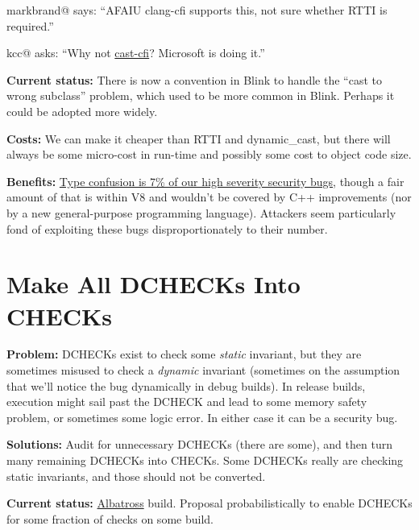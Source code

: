 \documentclass[a4paper,12pt,notitlepage,twoside,openright]{article}
\newcommand{\uline}[1]{#1}
\begin{document}
{markbrand@ says: ``AFAIU clang-cfi supports this, not sure whether RTTI
is required.''

kcc@ asks: ``Why
not \href{https://www.google.com/url?q=https://clang.llvm.org/docs/ControlFlowIntegrity.html\%23bad-cast-checking\&sa=D\&source=editors\&ust=1631944129096000\&usg=AOvVaw1hIEhYq5DWiRx3GcY8-Eni}{\uline{cast-cfi}}?
Microsoft is doing it.''

\textbf{Current status:} There is now a convention in Blink to handle
the ``cast to wrong subclass'' problem, which used to be more common in
Blink. Perhaps it could be adopted more widely.

\textbf{Costs:} We can make it cheaper than RTTI and dynamic\_cast, but
there will always be some micro-cost in run-time and possibly some cost
to object code size.

\textbf{Benefits:} \href{https://docs.google.com/document/d/e/2PACX-1vRZr-HJcYmf2Y76DhewaiJOhRNpjGHCxliAQTBhFxzv1QTae9o8mhBmDl32CRIuaWZLt5kVeH9e9jXv/pub\#h.eoikp3r0cwlf}{\uline{Type
confusion is 7\% of our high severity security bugs}}, though a fair
amount of that is within V8 and wouldn't be covered by C++ improvements
(nor by a new general-purpose programming language). Attackers seem
particularly fond of exploiting these bugs disproportionately to their
number.

\section{Make All DCHECKs Into CHECKs}

\textbf{Problem:} DCHECKs exist to check some \emph{static} invariant,
but they are sometimes misused to check
a \emph{dynamic} invariant (sometimes on the assumption that we'll
notice the bug dynamically in debug builds). In release builds,
execution might sail past the DCHECK and lead to some memory safety
problem, or sometimes some logic error. In either case it can be a
security bug.

\textbf{Solutions:} Audit for unnecessary DCHECKs (there are some), and
then turn many remaining DCHECKs into CHECKs. Some DCHECKs really are
checking static invariants, and those should not be converted.

\textbf{Current
status:} \href{https://www.google.com/url?q=https://docs.google.com/document/d/1QY4IbbJ8X6G-6-cMheEkP_mT7ZNPCuUJIW2sr_mEiH4/edit\&sa=D\&source=editors\&ust=1631944129101000\&usg=AOvVaw2BlusRZodOmwWxlt2Ifxxe}{\uline{Albatross}} build.
Proposal probabilistically to enable DCHECKs for some fraction of checks
on some build.

}
\end{document}
